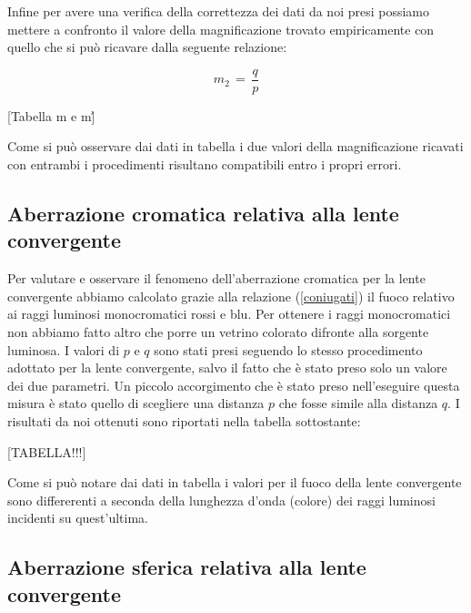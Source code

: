 Infine per avere una verifica della correttezza dei dati da noi presi possiamo mettere a confronto il valore della magnificazione trovato empiricamente con quello che si può ricavare dalla seguente relazione:

\begin{equation}
	m_{2} \,=\, \frac{q}{p}
\end{equation}

[Tabella m e m\']

Come si può osservare dai dati in tabella i due valori della magnificazione ricavati con entrambi i procedimenti risultano compatibili entro i propri errori. 

\subsection{Aberrazione cromatica relativa alla lente convergente}

Per valutare e osservare il fenomeno dell'aberrazione cromatica per la lente convergente abbiamo calcolato grazie alla relazione (\ref{coniugati}) il fuoco relativo ai raggi luminosi monocromatici rossi e blu. Per ottenere i raggi monocromatici non abbiamo fatto altro che porre un vetrino colorato difronte alla sorgente luminosa. I valori di $p$ e $q$ sono stati presi seguendo lo stesso procedimento adottato per la lente convergente, salvo il fatto che è stato preso solo un valore dei due parametri.
Un piccolo accorgimento che è stato preso nell'eseguire questa misura è stato quello di scegliere una distanza $p$ che fosse simile alla distanza $q$.
I risultati da noi ottenuti sono riportati nella tabella sottostante:

[TABELLA!!!]

Come si può notare dai dati in tabella i valori per il fuoco della lente convergente sono differerenti a seconda della lunghezza d'onda (colore) dei raggi luminosi incidenti su quest'ultima. 

\subsection{Aberrazione sferica relativa alla lente convergente}


